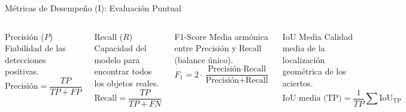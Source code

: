 \documentclass[aspectratio=169]{beamer}
\begin{document}
\begin{frame}{Métricas de Desempeño (I): Evaluación Puntual}
	\begin{columns}[t] %
		
		\begin{block}{Precisión ($P$)}
			Fiabilidad de las detecciones positivas.
			\begin{equation*}
			\text{Precisión} = \frac{TP}{TP + FP}
			\end{equation*}
		\end{block}
		
		\vspace{0.3cm} %
		
		\begin{block}{Recall ($R$)}
			Capacidad del modelo para encontrar todos los objetos reales.
			\begin{equation*}
			\text{Recall} = \frac{TP}{TP + FN}
			\end{equation*}
		\end{block}
		
		\begin{block}{F1-Score}
			Media armónica entre Precisión y Recall (balance único).
			\begin{equation*}
			F_1 = 2 \cdot \frac{\text{Precisión} \cdot \text{Recall}}{\text{Precisión} + \text{Recall}}
			\end{equation*}
		\end{block}
		
		\vspace{0.3cm} %
		
		\begin{block}{IoU Media}
			Calidad media de la localización geométrica de los aciertos.
			\begin{equation*}
			\text{IoU media (TP)} = \frac{1}{TP} \sum \text{IoU}_{\text{TP}}
			\end{equation*}
		\end{block}
	\end{columns}
\end{frame}
\end{document}
